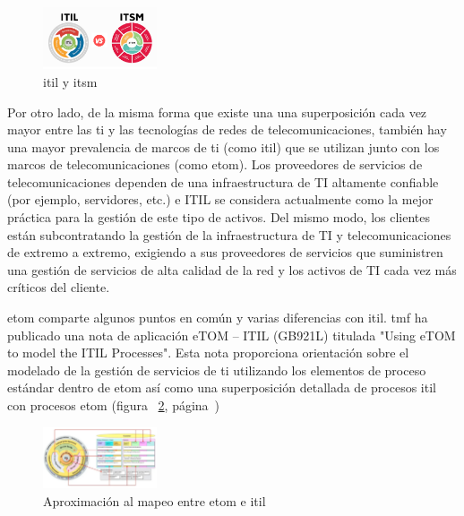 \begin{figure}[H]
  \centering
  \includegraphics[width=0.30\textwidth]{imaxes/itil-vs-itsm.png}
  \caption{ \acrshort{itil} y \acrshort{itsm}}
  \label{fig:itil-vs-itsm}
\end{figure}



Por otro lado, de la misma forma que existe una una superposición cada vez mayor entre las \acrshort{ti} y las tecnologías de redes de telecomunicaciones, también hay una mayor prevalencia de marcos de \acrshort{ti} (como \acrshort{itil}) que se utilizan junto con los marcos de telecomunicaciones (como \acrshort{etom}). Los proveedores de servicios de telecomunicaciones dependen de una infraestructura de TI altamente confiable (por ejemplo, servidores, etc.) e ITIL se considera actualmente como la mejor práctica para la gestión de este tipo de activos. Del mismo modo, los clientes están subcontratando la gestión de la infraestructura de TI y telecomunicaciones de extremo a extremo, exigiendo a sus proveedores de servicios que suministren una gestión de servicios de alta calidad de la red y los activos de TI cada vez más críticos del cliente.


\acrshort{etom} comparte algunos puntos en común y varias diferencias con \acrshort{itil}. \acrshort{tmf} ha publicado una nota de aplicación eTOM – ITIL (GB921L) titulada "Using eTOM to model the ITIL Processes". Esta nota proporciona orientación sobre el modelado de la gestión de servicios de \acrshort{ti} utilizando los elementos de proceso estándar dentro de \acrshort{etom} así como una superposición detallada de procesos \acrshort{itil} con procesos \acrshort{etom} (figura ~\ref{fig:itil-etom}, página~\pageref{fig:itil-etom})



\begin{figure}[H]
  \centering
  \includegraphics[width=0.30\textwidth]{imaxes/etom-itil.png}
  \caption{Aproximación al mapeo entre \acrshort{etom} e \acrshort{itil}~\cite{Itil-eTom}}
  \label{fig:itil-etom}
\end{figure}



